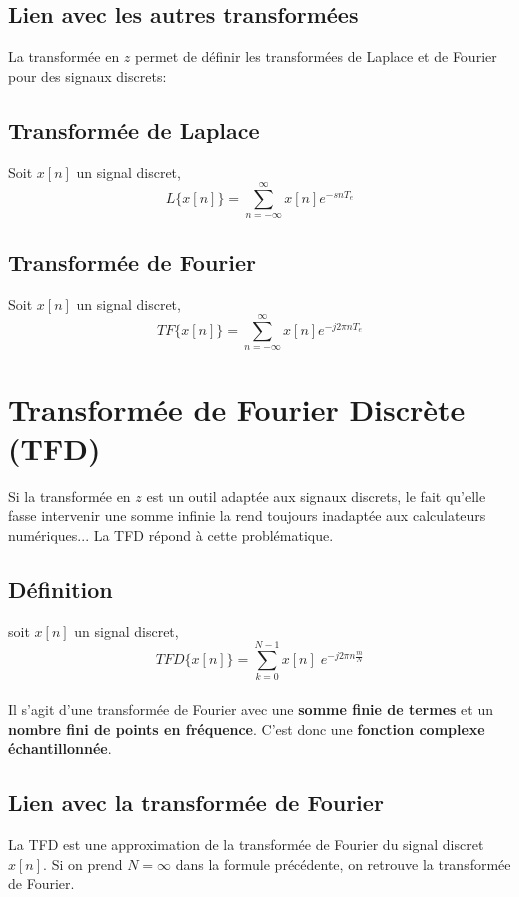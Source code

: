 \documentclass[11pt,a4paper]{article}
\begin{document}
\newpage
\subsection{Lien avec les autres transformées}
La transformée en $z$ permet de définir les transformées de Laplace et de Fourier pour des signaux discrets:

\subsection{Transformée de Laplace}
Soit $x[n]$ un signal discret,\\
 
\[ \boxed{L\{x[n] \} = \sum_{n = -\infty}^{\infty} x[n] e^{-snT_e}} \] 

\subsection{Transformée de Fourier}
Soit $x[n]$ un signal discret,\\

\[\boxed{TF\{x[n] \} = \sum_{n = -\infty}^{\infty} x[n] e^{-j2\pi nT_e}}  \]
\vspace{0.3cm}
\section{Transformée de Fourier Discrète (TFD)}
Si la transformée en $z$ est un outil adaptée aux signaux discrets, le fait qu'elle fasse intervenir une somme infinie la rend toujours inadaptée aux calculateurs numériques... La TFD répond à cette problématique.
\subsection{Définition}
soit $x[n]$ un signal discret,
\[ TFD\{ x[n] \} =  \sum_{k = 0}^{N-1} x[n] \; e^{-j 2 \pi n \frac{m}{N}}\]\\

Il s'agit d'une transformée de Fourier avec une \textbf{somme finie de termes} et un\textbf{ nombre fini de points en fréquence}. C'est donc une \textbf{fonction complexe échantillonnée}.

\subsection{Lien avec la transformée de Fourier}
La TFD est une approximation de la transformée de Fourier du signal discret $x[n]$. Si on prend $N = \infty$ dans la formule précédente, on retrouve la transformée de Fourier. 
\end{document}
